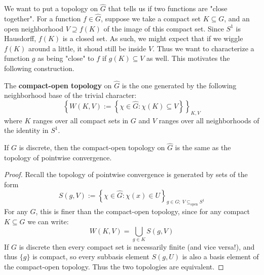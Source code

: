 \documentclass[11pt, x11names]{article}
\newcommand{\set}[1]{\left\{ #1 \right\}}
\renewcommand{\hat}{\widehat}
\begin{document}
We want to put a topology on $\hat{G}$ that tells us if two functions are "close together".
For a function $f \in \hat{G}$, suppose we take a compact set $K \subseteq G$, and an open 
neighborhood $V \supseteq f(K)$ of the image of this compact set. Since $S^1$ is Hausdorff,
$f(K)$ is a closed set. As such, we might expect that if we wiggle $f(K)$ around a little, it
shoud still be inside $V$. Thus we want to characterize a function $g$ as being "close" to $f$
if $g(K) \subseteq V$ as well. This motivates the following construction.

\begin{defn}
The \textbf{compact-open topology} on $\hat{G}$ is the one generated by the following neighborhood base
of the trivial character:
\begin{equation*}
    \set{W(K, V) := \set{\chi \in \hat{G} : \chi(K) \subseteq V}}_{K, V}
\end{equation*}
where $K$ ranges over all compact sets in $G$ and $V$ ranges over all neighborhoods of the identity 
in $S^1$.
\end{defn}

\begin{prop}
\label{compact-open = ptwise convergence}
If $G$ is discrete, then  the compact-open topology on $\hat{G}$ is the same as the topology 
of pointwise convergence.
\end{prop}
\begin{proof}
Recall the topology of pointwise convergence is generated by sets of the form
\begin{equation*}
    S(g, V) := \set{\chi \in \hat{G} : \chi(x) \in U}_{g \in G; \ V \subseteq_{\textrm{open}} S^1}
\end{equation*}
For any $G$, this is finer than the compact-open topology, since for any compact $K \subseteq G$ we can write:
\begin{equation*}
    W(K, V) = \bigcup_{g \in K} S(g, V)
\end{equation*} 
If $G$ is discrete then every compact set is necessarily finite (and vice versa!), and thus $\{g\}$ is compact, so every subbasis element $S(g, U)$ is also a basis element of the compact-open topology. Thus the two topologies are equivalent.
\end{proof}
\end{document}
